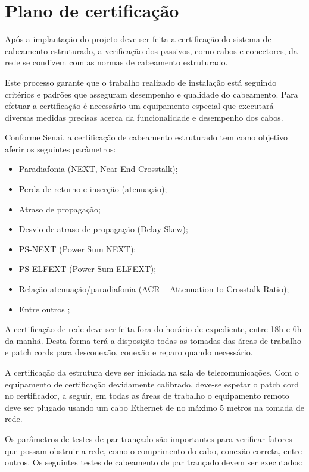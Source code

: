 \documentclass[	DIV=calc,%
							paper=a4,%
							fontsize=12pt,%
							onecolumn]{scrartcl}	 					%
\begin{document}
\section{Plano de certificação}

Após a implantação do projeto deve ser feita a certificação do sistema de cabeamento estruturado, a verificação dos passivos, como cabos e conectores, da rede se condizem com as normas de cabeamento estruturado. 

Este processo garante que o trabalho realizado de instalação está seguindo critérios e padrões que asseguram desempenho e qualidade do cabeamento. Para efetuar a certificação é necessário um equipamento especial que executará diversas medidas precisas acerca da funcionalidade e desempenho dos cabos.

Conforme Senai, a certificação de cabeamento estruturado tem como objetivo  aferir os seguintes parâmetros:
\begin{itemize}
	\item Paradiafonia (NEXT, Near End Crosstalk);
	\item Perda de retorno e inserção (atenuação);
	\item Atraso de propagação;
	\item Desvio de atraso de propagação (Delay Skew);
	\item PS-NEXT (Power Sum NEXT);
	\item PS-ELFEXT (Power Sum ELFEXT);
	\item Relação atenuação/paradiafonia (ACR – Attenuation to Crosstalk Ratio);
	\item Entre outros \cite{senai2012};
\end{itemize}

A certificação de rede deve ser feita fora do horário de expediente, entre 18h e 6h da manhã. Desta forma terá a disposição todas as tomadas das áreas de trabalho e patch cords para desconexão, conexão e reparo quando necessário.

A certificação da estrutura deve ser iniciada na sala de telecomunicações. Com o equipamento de certificação devidamente calibrado, deve-se espetar o patch cord no certificador, a seguir, em todas as áreas de trabalho o equipamento remoto deve ser plugado usando um cabo Ethernet de no máximo 5 metros na tomada de rede.

Os parâmetros de testes de par trançado são importantes para verificar fatores que possam obstruir a rede, como o comprimento do cabo, conexão correta, entre outros. Os seguintes testes de cabeamento de par trançado devem ser executados: 
\end{document}
